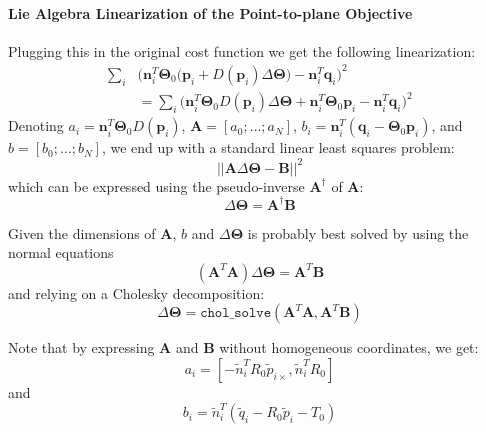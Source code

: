 \paragraph{Lie Algebra Linearization of the Point-to-plane Objective}
Plugging this in the original cost function we get the following linearization:
\begin{equation}
\begin{split}
\sum_i & \Big(\mathbf{n}_i^T \mathbf{\Theta}_0 \big(\mathbf{p}_i + D(\mathbf{p}_i)\Delta\mathbf{\Theta} \big) - \mathbf{n}_i^T \mathbf{q}_i\Big)^2
\\
&= \sum_i \Big(\mathbf{n}_i^T \mathbf{\Theta}_0 D(\mathbf{p}_i)\Delta\mathbf{\Theta} + \mathbf{n}_i^T \mathbf{\Theta}_0 \mathbf{p}_i - \mathbf{n}_i^T \mathbf{q}_i\Big)^2
\end{split}
\end{equation}
Denoting $a_i = \mathbf{n}_i^T \mathbf{\Theta}_0 D(\mathbf{p}_i)$, $\mathbf{A}=[a_0;\ldots;a_N]$,
$b_i = \mathbf{n}_i^T (\mathbf{q}_i - \mathbf{\Theta}_0 \mathbf{p}_i)$, and $b=[b_0;\ldots;b_N]$, we end up with a standard linear least squares problem:
\begin{equation}
||\mathbf{A} \Delta\mathbf{\Theta} - \mathbf{B}||^2
\end{equation}
which can be expressed using the pseudo-inverse $\mathbf{A}^{\dagger}$ of $\mathbf{A}$:
\begin{equation}
\Delta\mathbf{\Theta} = \mathbf{A}^{\dagger} \mathbf{B}
\end{equation}

Given the dimensions of $\mathbf{A}$, $b$ and $\Delta\mathbf{\Theta}$ is probably best solved by using the normal equations
\begin{equation}
(\mathbf{A}^T \mathbf{A}) \Delta\mathbf{\Theta} = \mathbf{A}^T \mathbf{B}
\end{equation}
and relying on a Cholesky decomposition:
\begin{equation}
\Delta\mathbf{\Theta} = \texttt{chol\_solve}(\mathbf{A}^T \mathbf{A}, \mathbf{A}^T \mathbf{B})
\end{equation}

Note that by expressing $\mathbf{A}$ and $\mathbf{B}$ without homogeneous coordinates, we get:
\begin{equation}
a_i = [-\tilde{n}_i^T R_0 {{\tilde{p}}_{i\times}}, \tilde{n}_i^T R_0]
\end{equation}
and
\begin{equation}
b_i = \tilde{n}_i^T (\tilde{q}_i - R_0 \tilde{p}_i - T_0)
\end{equation}

